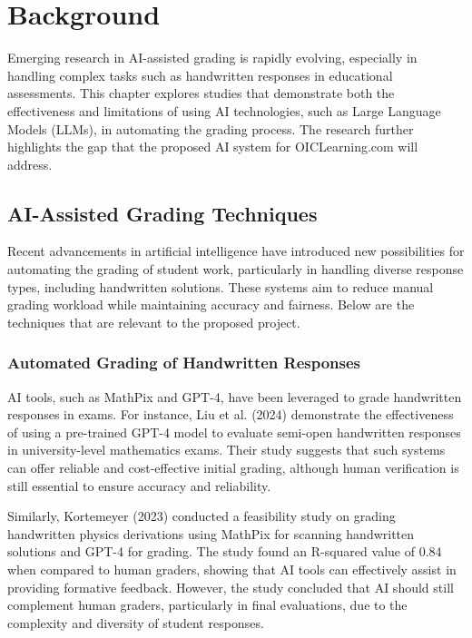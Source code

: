 \documentclass[ms,twoside,print]{nuthesis}
\begin{document}
\chapter{Background}

Emerging research in AI-assisted grading is rapidly evolving, especially in handling complex tasks such as handwritten responses in educational assessments. This chapter explores studies that demonstrate both the effectiveness and limitations of using AI technologies, such as Large Language Models (LLMs), in automating the grading process. The research further highlights the gap that the proposed AI system for OICLearning.com will address.

\section{AI-Assisted Grading Techniques}

Recent advancements in artificial intelligence have introduced new possibilities for automating the grading of student work, particularly in handling diverse response types, including handwritten solutions. These systems aim to reduce manual grading workload while maintaining accuracy and fairness. Below are the techniques that are relevant to the proposed project.

\subsection{Automated Grading of Handwritten Responses}

AI tools, such as MathPix and GPT-4, have been leveraged to grade handwritten responses in exams. For instance, Liu et al. (2024) \cite{Liu2024} demonstrate the effectiveness of using a pre-trained GPT-4 model to evaluate semi-open handwritten responses in university-level mathematics exams. Their study suggests that such systems can offer reliable and cost-effective initial grading, although human verification is still essential to ensure accuracy and reliability.

Similarly, Kortemeyer (2023) \cite{Kortemeyer2023} conducted a feasibility study on grading handwritten physics derivations using MathPix for scanning handwritten solutions and GPT-4 for grading. The study found an R-squared value of 0.84 when compared to human graders, showing that AI tools can effectively assist in providing formative feedback. However, the study concluded that AI should still complement human graders, particularly in final evaluations, due to the complexity and diversity of student responses.
\end{document}
